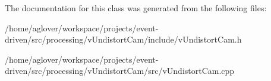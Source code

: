 The documentation for this class was generated from the following files\+:\begin{DoxyCompactItemize}
\item 
/home/aglover/workspace/projects/event-\/driven/src/processing/v\+Undistort\+Cam/include/v\+Undistort\+Cam.\+h\item 
/home/aglover/workspace/projects/event-\/driven/src/processing/v\+Undistort\+Cam/src/v\+Undistort\+Cam.\+cpp\end{DoxyCompactItemize}
